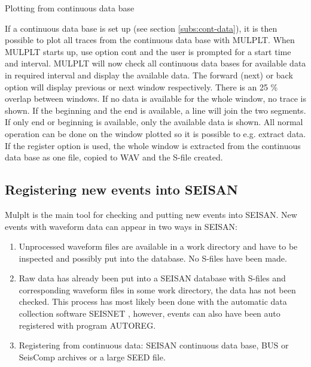 Plotting from continuous data base 

If a continuous data base is set up (see section \ref{subs:cont-data}), it is then possible to plot all traces from the continuous data base with MULPLT. When MULPLT starts up, use option cont and the user is prompted for a start time and interval. MULPLT will now check all continuous data bases for available data in required interval and display the available data. The forward (next) or back option will display previous or next window respectively. There is an 25 \% overlap between windows. If no data is available for the whole window, no trace is shown. If the beginning and the end is available, a line will join the two segments. If only end or beginning is available, only the available data is shown. All normal operation can be done on the window plotted so it is possible to e.g. extract data. If the register option is used, the whole window is extracted from the continuous data base as one file, copied to WAV and the S-file created. 

\subsection{Registering new events into SEISAN}

Mulplt is the main tool for checking and putting new events into SEISAN. New events with waveform data can appear in two ways in SEISAN: 

\begin{enumerate}
\item
 Unprocessed waveform files are available in a work directory and have to be inspected and possibly put into the database. No S-files have been made. 
\item
 Raw data has already been put into a SEISAN database with S-files and corresponding waveform files in some work directory, the data has not been checked. This process has most likely been done with the automatic data collection software SEISNET \citep{ottemoller1999}, however, events can also have been auto registered with program AUTOREG.
\item 

Registering from continuous data: SEISAN continuous data base, BUS or SeisComp archives or a large SEED file.

\end{enumerate}

